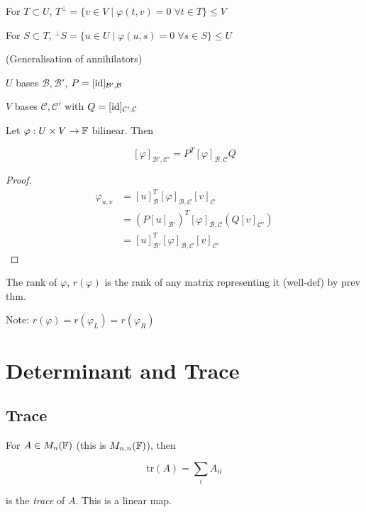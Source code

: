 \documentclass[a4paper]{article}
\begin{document}
\begin{defi}
	For $ T \subset U $, $ T^{\perp} = \{ v \in V \; | \; \varphi(t,v) = 0 \; \forall t \in T \} \leq V $
	
	For $ S \subset T $, $ ^{\perp}S = \{ u \in U \; | \; \varphi(u,s) = 0 \; \forall s \in S \} \leq U $ 
	
	(Generalisation of annihilators)
\end{defi}

\begin{prop} 
	$ U $ bases $ \mathcal{B},\mathcal{B'} $, $ P = [\operatorname{id}]_{\mathcal{B}',\mathcal{B}} $
	
	$ V $ bases $ \mathcal{C},\mathcal{C}' $ with $ Q =[ \operatorname{id}]_{\mathcal{C'},\mathcal{C}} $
	
	Let $ \varphi: U \times V  \to \mathbb{F} $ bilinear. Then
	
	
	\[ [\varphi]_{\mathcal{B}',\mathcal{C}'} = P^{T} [ \varphi]_{\mathcal{B},\mathcal{C}}Q \]
\end{prop}

\begin{proof}
	
	\begin{align*}
	\varphi_{u,v} & = [u]_{\mathcal{B}}^{T} [\varphi]_{\mathcal{B},\mathcal{C}} [v]_{\mathcal{C}} \\
	& = (P[u]_{\mathcal{B}'})^{T} [\varphi]_{\mathcal{B},\mathcal{C}} (Q[v]_{\mathcal{C}'}) \\
	& = [u]_{\mathcal{B}'}^{T} [\varphi]_{\mathcal{B},\mathcal{C}} [v]_{\mathcal{C}'}
	\end{align*}
	
\end{proof}


\begin{defi}
	The rank of $ \varphi $, $ r(\varphi) $ is the rank of any matrix representing it (well-def) by prev thm.
\end{defi}

Note: $ r(\varphi) = r(\varphi_{L}) = r(\varphi_{R}) $


\section{Determinant and Trace}

\subsection{Trace}

\begin{defi}
	For $ A \in M_{n}(\mathbb{F}) $ (this is $ M_{n,n}(\mathbb{F}) $), then
	
	\[ \text{tr}(A) = \sum_{i}A_{ii}  \]
	
	is the \emph{trace} of $ A $. This is a linear map.
\end{defi}
\end{document}
